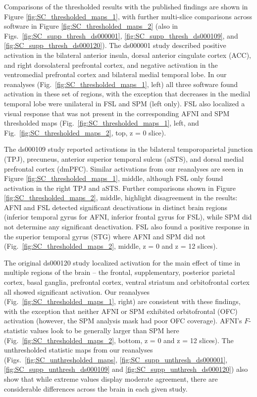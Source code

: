 Comparisons of the thresholded results with the published findings are shown in Figure \ref{fig:SC_thresholded_maps_1}, with further multi-slice comparisons across software in Figure \ref{fig:SC_thresholded_maps_2} (also in Figs.\ \ref{fig:SC_supp_thresh_ds000001}, \ref{fig:SC_supp_thresh_ds000109}, and \ref{fig:SC_supp_thresh_ds000120}). The ds000001 study described positive activation in the bilateral anterior insula, dorsal anterior cingulate cortex (ACC), and right dorsolateral prefrontal cortex, and negative activation in the ventromedial prefrontal cortex and bilateral medial temporal lobe. In our reanalyses (Fig.\  \ref{fig:SC_thresholded_maps_1}, left) all three software found activation in these set of regions, with the exception that decreases in the medial temporal lobe were unilateral in FSL and SPM (left only). FSL also localized a visual response that was not present in the corresponding AFNI and SPM thresholded maps (Fig.\  \ref{fig:SC_thresholded_maps_1},  left, and Fig.\  \ref{fig:SC_thresholded_maps_2}, top, z = 0 slice).

The ds000109 study reported activations in the bilateral temporoparietal junction (TPJ), precuneus, anterior superior temporal sulcus (aSTS), and dorsal medial prefrontal cortex (dmPFC). Similar activations from our reanalyses are seen in Figure \ref{fig:SC_thresholded_maps_1}, middle, although FSL only found activation in the right TPJ and aSTS. Further comparisons shown in Figure \ref{fig:SC_thresholded_maps_2}, middle, highlight disagreement in the results: AFNI and FSL detected significant deactivations in distinct brain regions (inferior temporal gyrus for AFNI, inferior frontal gyrus for FSL), while SPM did not determine any significant deactivation. FSL also found a positive response in the superior temporal gyrus  (STG) where AFNI and SPM did not (Fig.\ \ref{fig:SC_thresholded_maps_2}, middle, z = 0 and z = 12 slices).

The original ds000120 study localized activation for the main effect of time in multiple regions of the brain -- the frontal, supplementary, posterior parietal cortex, basal ganglia, prefrontal cortex, ventral striatum and orbitofrontal cortex all showed significant activation. Our reanalyses (Fig.\ \ref{fig:SC_thresholded_maps_1}, right) are consistent with these findings, with the exception that neither AFNI or SPM exhibited orbitofrontal (OFC) activation (however, the SPM  analysis mask had poor OFC coverage). AFNI's $F$-statistic values look to be generally larger than SPM here (Fig.\ \ref{fig:SC_thresholded_maps_2}, bottom, z = 0 and z = 12 slices). The unthresholded statistic maps from our reanalyses (Figs.\ \ref{fig:SC_unthresholded_maps}, \ref{fig:SC_supp_unthresh_ds000001}, \ref{fig:SC_supp_unthresh_ds000109} and \ref{fig:SC_supp_unthresh_ds000120}) also show that while extreme values display moderate agreement, there are considerable differences across the brain in each given study.


